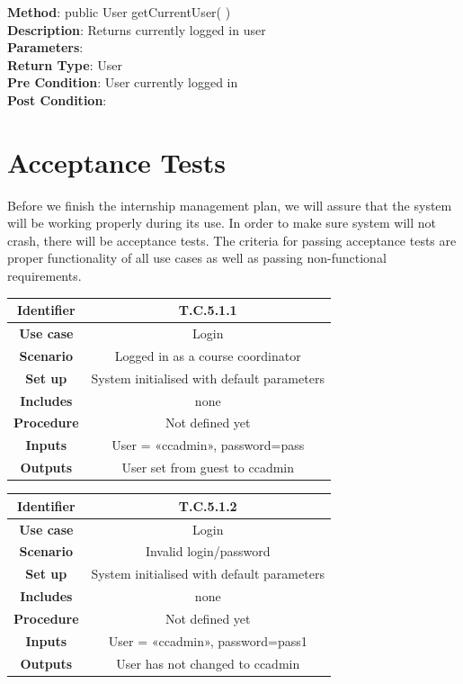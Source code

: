 \documentclass{l3deliverable}
\begin{document}
\textbf{Method}: public User getCurrentUser( ) \\
\textbf{Description}: Returns currently logged in user\\
\textbf{Parameters}:\\
\textbf{Return Type}: User\\
\textbf{Pre Condition}: User currently logged in\\
\textbf{Post Condition}:\\




\section{Acceptance Tests}

Before we finish the internship management plan, we will assure that the system will be working properly during its use. In order to make sure system will not crash, there will be acceptance tests. The criteria for passing acceptance tests are proper functionality of all use cases as well as passing non-functional requirements.\\

\begin{tabular}{|c|c|}
\hline \textbf{Identifier} & T.C.5.1.1\\
\hline \textbf{Use case} & Login \\
\hline \textbf{Scenario} & Logged in as a course coordinator \\
\hline \textbf{Set up} & System initialised with default parameters\\
\hline \textbf{Includes} & none\\
\hline \textbf{Procedure} & Not defined yet\\
\hline \textbf{Inputs} & User = «ccadmin», password=pass\\
\hline \textbf{Outputs} & User set from guest to ccadmin \\
\hline
\end{tabular}

\begin{tabular}{|c|c|}
\hline \textbf{Identifier} & T.C.5.1.2 \\
\hline \textbf{Use case} & Login\\
\hline \textbf{Scenario} & Invalid login/password\\
\hline \textbf{Set up} & System initialised with default parameters\\
\hline \textbf{Includes} & none\\
\hline \textbf{Procedure} & Not defined yet\\
\hline \textbf{Inputs} & User = «ccadmin», password=pass1\\
\hline \textbf{Outputs} & User has not changed to ccadmin \\
\hline
\end{tabular}
\end{document}

